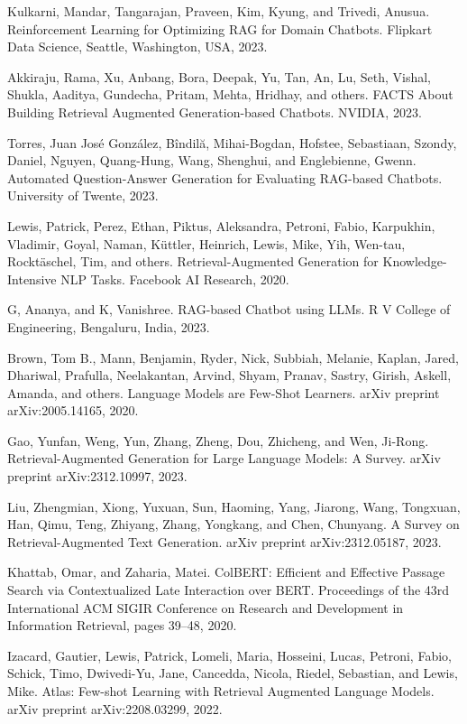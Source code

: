 \documentclass[12pt,a4paper]{report}
\begin{document}
\begin{thebibliography}{10}

Kulkarni, Mandar, Tangarajan, Praveen, Kim, Kyung, and Trivedi, Anusua.
\newblock Reinforcement Learning for Optimizing RAG for Domain Chatbots.
\newblock Flipkart Data Science, Seattle, Washington, USA, 2023.

Akkiraju, Rama, Xu, Anbang, Bora, Deepak, Yu, Tan, An, Lu, Seth, Vishal, Shukla, Aaditya, Gundecha, Pritam, Mehta, Hridhay, and others.
\newblock FACTS About Building Retrieval Augmented Generation-based Chatbots.
\newblock NVIDIA, 2023.

Torres, Juan José González, Bîndilă, Mihai-Bogdan, Hofstee, Sebastiaan, Szondy, Daniel, Nguyen, Quang-Hung, Wang, Shenghui, and Englebienne, Gwenn.
\newblock Automated Question-Answer Generation for Evaluating RAG-based Chatbots.
\newblock University of Twente, 2023.

Lewis, Patrick, Perez, Ethan, Piktus, Aleksandra, Petroni, Fabio, Karpukhin, Vladimir, Goyal, Naman, Küttler, Heinrich, Lewis, Mike, Yih, Wen-tau, Rocktäschel, Tim, and others.
\newblock Retrieval-Augmented Generation for Knowledge-Intensive NLP Tasks.
\newblock Facebook AI Research, 2020.

G, Ananya, and K, Vanishree.
\newblock RAG-based Chatbot using LLMs.
\newblock R V College of Engineering, Bengaluru, India, 2023.

Brown, Tom B., Mann, Benjamin, Ryder, Nick, Subbiah, Melanie, Kaplan, Jared, Dhariwal, Prafulla, Neelakantan, Arvind, Shyam, Pranav, Sastry, Girish, Askell, Amanda, and others.
\newblock Language Models are Few-Shot Learners.
\newblock arXiv preprint arXiv:2005.14165, 2020.

Gao, Yunfan, Weng, Yun, Zhang, Zheng, Dou, Zhicheng, and Wen, Ji-Rong.
\newblock Retrieval-Augmented Generation for Large Language Models: A Survey.
\newblock arXiv preprint arXiv:2312.10997, 2023.

Liu, Zhengmian, Xiong, Yuxuan, Sun, Haoming, Yang, Jiarong, Wang, Tongxuan, Han, Qimu, Teng, Zhiyang, Zhang, Yongkang, and Chen, Chunyang.
\newblock A Survey on Retrieval-Augmented Text Generation.
\newblock arXiv preprint arXiv:2312.05187, 2023.

Khattab, Omar, and Zaharia, Matei.
\newblock ColBERT: Efficient and Effective Passage Search via Contextualized Late Interaction over BERT.
\newblock Proceedings of the 43rd International ACM SIGIR Conference on Research and Development in Information Retrieval, pages 39--48, 2020.

Izacard, Gautier, Lewis, Patrick, Lomeli, Maria, Hosseini, Lucas, Petroni, Fabio, Schick, Timo, Dwivedi-Yu, Jane, Cancedda, Nicola, Riedel, Sebastian, and Lewis, Mike.
\newblock Atlas: Few-shot Learning with Retrieval Augmented Language Models.
\newblock arXiv preprint arXiv:2208.03299, 2022.

\end{thebibliography}
\end{document}
